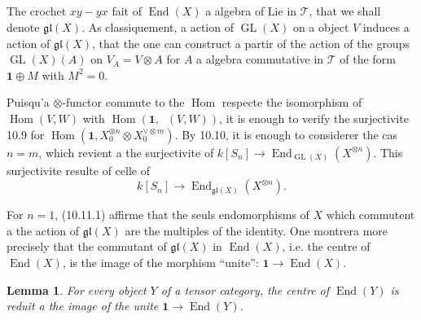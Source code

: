 \documentclass[11pt,a4paper]{article}
\theoremstyle{plain}
\newtheorem{lemma}[theorem]{Lemma}
\theoremstyle{definition}
\DeclareMathOperator{\Hom}{Hom}
\DeclareMathOperator{\End}{End}
\DeclareMathOperator{\GL}{GL}
\DeclareMathOperator{\iHom}{\underline{Hom}}
\begin{document}
\subsection{}
The crochet $xy - yx$ fait of $\End(X)$ a algebra of Lie in $\mathcal{T}$, that we shall denote $\mathfrak{gl}(X)$. As classiquement, a action of $\GL(X)$ on a object $V$ induces a action of $\mathfrak{gl}(X)$, that the one can construct a partir of the action of the groups $\GL(X)(A)$ on $V_A = V \otimes A$ for $A$ a algebra commutative in $\mathcal{T}$ of the form $\mathbf{1} \oplus M$ with $M^2 = 0$.

Puisqu'a $\otimes$-functor commute to the $\Hom$ respecte the isomorphism of $\Hom(V, W)$ with $\Hom(\mathbf{1}, \iHom(V, W))$, it is enough to verify the surjectivite 10.9 for $\Hom(\mathbf{1}, X_0^{\otimes n} \otimes X_0^{\vee \otimes m})$. By 10.10, it is enough to considerer the cas $n = m$, which revient a the surjectivite of $k[S_n] \to \End_{\GL(X)}(X^{\otimes n})$. This surjectivite resulte of celle of
\begin{equation}
k[S_n] \to \End_{\mathfrak{gl}(X)}(X^{\otimes n}). \tag{10.11.1}
\end{equation}

For $n = 1$, (10.11.1) affirme that the seuls endomorphisms of $X$ which commutent a the action of $\mathfrak{gl}(X)$ are the multiples of the identity. One montrera more precisely that the commutant of $\mathfrak{gl}(X)$ in $\End(X)$, i.e. the centre of $\End(X)$, is the image of the morphism ``unite'': $\mathbf{1} \to \End(X)$.

\begin{lemma}
For every object $Y$ of a tensor category, the centre of $\End(Y)$ is reduit a the image of the unite $\mathbf{1} \to \End(Y)$.
\end{lemma}
\end{document}
